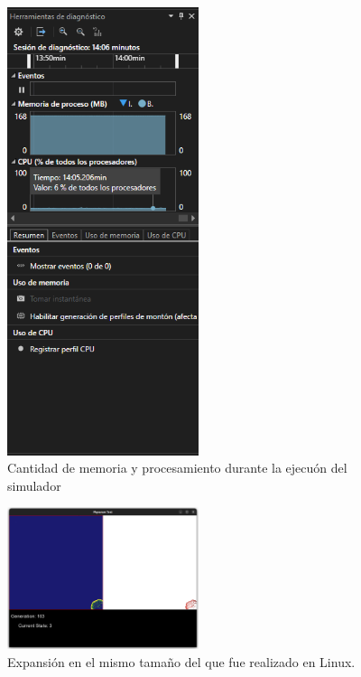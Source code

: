     \begin{figure}[htbp]
        \centering
        \includegraphics[width=0.5\textwidth]{./images/Pruebas/simulador/image080.png}
        \caption{Cantidad de memoria y procesamiento durante la ejecu\'on del simulador}
        \label{fig:Ruta 80}
    \end{figure}
    \vskip 0.5cm
    \begin{figure}[htbp]
        \centering
        \includegraphics[width=0.5\textwidth]{./images/Pruebas/simulador/image081.png}
        \caption{Expansi\'on en el mismo tama\~no del que fue realizado en Linux.}
        \label{fig:Ruta 81}
    \end{figure}

